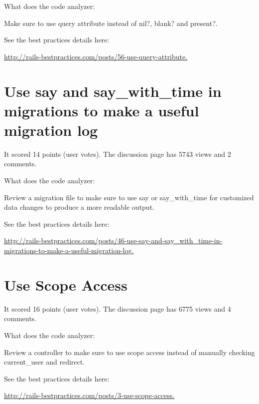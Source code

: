 What does the code analyzer:

Make sure to use query attribute instead of nil?, blank? and present?.

See the best practices details here:

\url{http://rails-bestpractices.com/posts/56-use-query-attribute.}

   
\section{Use say and say\_with\_time in migrations to make a useful migration log}


It scored 14 points (user votes). 
The discussion page has 5743 views and 2 comments.

What does the code analyzer:

Review a migration file to make sure to use say or say\_with\_time for customized data changes to produce a more readable output.

See the best practices details here:
 
\url{http://rails-bestpractices.com/posts/46-use-say-and-say\_with\_time-in-migrations-to-make-a-useful-migration-log.}

\section{Use Scope Access}


It scored 16 points (user votes). 
The discussion page has 6775 views and 4 comments.

What does the code analyzer:

Review a controller to make sure to use scope access instead of manually checking current\_user and redirect.

See the best practices details here:
 
\url{http://rails-bestpractices.com/posts/3-use-scope-access.}




















